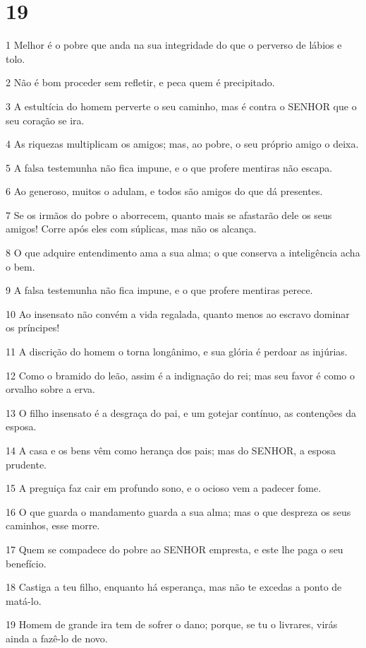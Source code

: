 \chapter{19}

\par 1 Melhor é o pobre que anda na sua integridade do que o perverso de lábios e tolo.
\par 2 Não é bom proceder sem refletir, e peca quem é precipitado.
\par 3 A estultícia do homem perverte o seu caminho, mas é contra o SENHOR que o seu coração se ira.
\par 4 As riquezas multiplicam os amigos; mas, ao pobre, o seu próprio amigo o deixa.
\par 5 A falsa testemunha não fica impune, e o que profere mentiras não escapa.
\par 6 Ao generoso, muitos o adulam, e todos são amigos do que dá presentes.
\par 7 Se os irmãos do pobre o aborrecem, quanto mais se afastarão dele os seus amigos! Corre após eles com súplicas, mas não os alcança.
\par 8 O que adquire entendimento ama a sua alma; o que conserva a inteligência acha o bem.
\par 9 A falsa testemunha não fica impune, e o que profere mentiras perece.
\par 10 Ao insensato não convém a vida regalada, quanto menos ao escravo dominar os príncipes!
\par 11 A discrição do homem o torna longânimo, e sua glória é perdoar as injúrias.
\par 12 Como o bramido do leão, assim é a indignação do rei; mas seu favor é como o orvalho sobre a erva.
\par 13 O filho insensato é a desgraça do pai, e um gotejar contínuo, as contenções da esposa.
\par 14 A casa e os bens vêm como herança dos pais; mas do SENHOR, a esposa prudente.
\par 15 A preguiça faz cair em profundo sono, e o ocioso vem a padecer fome.
\par 16 O que guarda o mandamento guarda a sua alma; mas o que despreza os seus caminhos, esse morre.
\par 17 Quem se compadece do pobre ao SENHOR empresta, e este lhe paga o seu benefício.
\par 18 Castiga a teu filho, enquanto há esperança, mas não te excedas a ponto de matá-lo.
\par 19 Homem de grande ira tem de sofrer o dano; porque, se tu o livrares, virás ainda a fazê-lo de novo.
